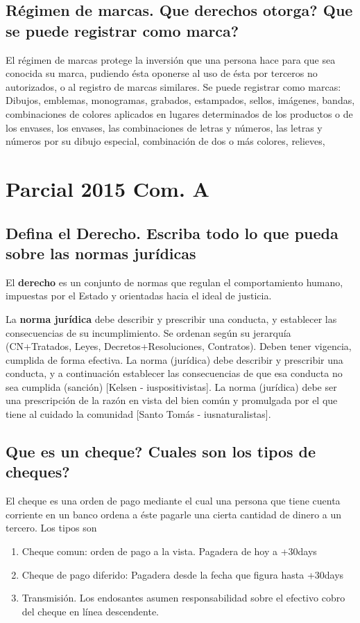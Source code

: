 \documentclass{article}
\begin{document}
\subsection{Régimen de marcas. Que derechos otorga? Que se puede registrar como marca?}
El régimen de marcas protege la inversión que una persona hace para que sea conocida su marca, pudiendo ésta oponerse al uso de ésta por terceros no autorizados, o al registro de marcas similares. Se puede registrar como marcas: Dibujos, emblemas, monogramas, grabados, estampados, sellos, imágenes, bandas, combinaciones de colores aplicados en lugares determinados de los productos o de los envases, los envases, las combinaciones de letras y números, las letras y números por su dibujo especial, combinación de dos o más colores, relieves, 


\section{Parcial 2015 Com. A}
\subsection{Defina el Derecho. Escriba todo lo que pueda sobre las normas jurídicas}
\label{sec:DefDerechoYNormaJuridica}
El \textbf{derecho} es un conjunto de normas que regulan el comportamiento humano, impuestas por el Estado y orientadas hacia el ideal de justicia. 

La \textbf{norma jurídica} debe describir y prescribir una conducta, y establecer las consecuencias de su incumplimiento. Se ordenan según su jerarquía (CN+Tratados, Leyes, Decretos+Resoluciones, Contratos). Deben tener vigencia, cumplida de forma efectiva.
La norma (jurídica) debe describir y prescribir una conducta, y a continuación establecer las consecuencias de que esa conducta no sea cumplida (sanción) [Kelsen - iuspositivistas]. 
La norma (jurídica) debe ser una prescripción de la razón en vista del bien común y promulgada por el que tiene al cuidado la comunidad [Santo Tomás - iusnaturalistas]. 

\subsection{Que es un cheque? Cuales son los tipos de cheques?}
El cheque es una orden de pago mediante el cual una persona que tiene cuenta corriente en un banco ordena a éste pagarle una cierta cantidad de dinero a un tercero. Los tipos son 
\begin{enumerate}
\item Cheque comun: orden de pago a la vista. Pagadera de hoy a +30days
\item Cheque de pago diferido: Pagadera desde la fecha que figura hasta +30days
\item Transmisión. Los endosantes asumen responsabilidad sobre el efectivo cobro del cheque en línea descendente. 

\end{enumerate}
\end{document}
